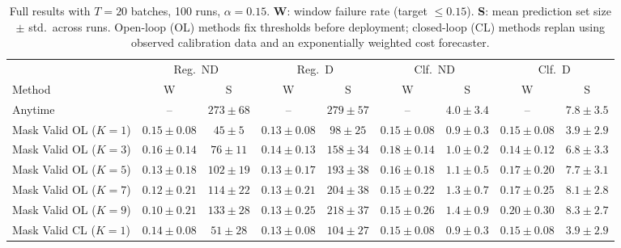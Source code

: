 \documentclass{uai2026} %
\newcommand{\1}{\mathbf{1}}
\begin{document}
\begin{table}[ht]
  \centering
  \caption{%
    Full results with $T = 20$ batches, 100 runs, $\alpha = 0.15$.
    \textbf{W}: window failure rate (target $\le 0.15$).
    \textbf{S}: mean prediction set size $\pm$ std.\ across runs.
    Open-loop (OL) methods fix thresholds before deployment; closed-loop (CL) methods replan using observed calibration data and an exponentially weighted cost forecaster.
  }
  \label{tab:results-full}
  \small
  \begin{tabular}{@{}l|cc|cc|cc|cc@{}}
    \toprule
    & \multicolumn{2}{c|}{Reg.\ ND}
    & \multicolumn{2}{c|}{Reg.\ D}
    & \multicolumn{2}{c|}{Clf.\ ND}
    & \multicolumn{2}{c}{Clf.\ D}                                                                                                                       \\
    \cmidrule(lr){2-3}\cmidrule(lr){4-5}\cmidrule(lr){6-7}\cmidrule(lr){8-9}
    Method                        & W                             & S            & W               & S            & W               & S             & W               & S             \\
    \midrule
    Anytime                       & --                            & $273{\pm}68$ & --              & $279{\pm}57$ & --              & $4.0{\pm}3.4$ & --              & $7.8{\pm}3.5$ \\
    \midrule
    Mask Valid OL ($K{=}1$)  & $0.15{\pm}0.08$               & $45{\pm}5$   & $0.13{\pm}0.08$ & $98{\pm}25$  & $0.15{\pm}0.08$ & $0.9{\pm}0.3$ & $0.15{\pm}0.08$ & $3.9{\pm}2.9$ \\
    Mask Valid OL ($K{=}3$)  & $0.16{\pm}0.14$               & $76{\pm}11$  & $0.14{\pm}0.13$ & $158{\pm}34$ & $0.18{\pm}0.14$ & $1.0{\pm}0.2$ & $0.14{\pm}0.12$ & $6.8{\pm}3.3$ \\
    Mask Valid OL ($K{=}5$)  & $0.13{\pm}0.18$               & $102{\pm}19$ & $0.13{\pm}0.17$ & $193{\pm}38$ & $0.16{\pm}0.18$ & $1.1{\pm}0.5$ & $0.17{\pm}0.20$ & $7.7{\pm}3.1$ \\
    Mask Valid OL ($K{=}7$)  & $0.12{\pm}0.21$               & $114{\pm}22$ & $0.13{\pm}0.21$ & $204{\pm}38$ & $0.15{\pm}0.22$ & $1.3{\pm}0.7$ & $0.17{\pm}0.25$ & $8.1{\pm}2.8$ \\
    Mask Valid OL ($K{=}9$)  & $0.10{\pm}0.21$               & $133{\pm}28$ & $0.13{\pm}0.25$ & $218{\pm}37$ & $0.15{\pm}0.26$ & $1.4{\pm}0.9$ & $0.20{\pm}0.30$ & $8.3{\pm}2.7$ \\
    \midrule
    Mask Valid CL ($K{=}1$)  & $0.14{\pm}0.08$               & $51{\pm}28$  & $0.13{\pm}0.08$ & $104{\pm}27$ & $0.15{\pm}0.08$ & $0.9{\pm}0.3$ & $0.15{\pm}0.08$ & $3.9{\pm}2.9$ \\

\end{tabular}
\end{table}
\end{document}

